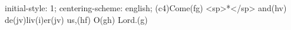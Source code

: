 initial-style: 1;
centering-scheme: english;
(c4)Come(fg) <sp>*</sp> and(hv) de(jv)liv(i)er(jv) us,(hf) O(gh) Lord.(g)

